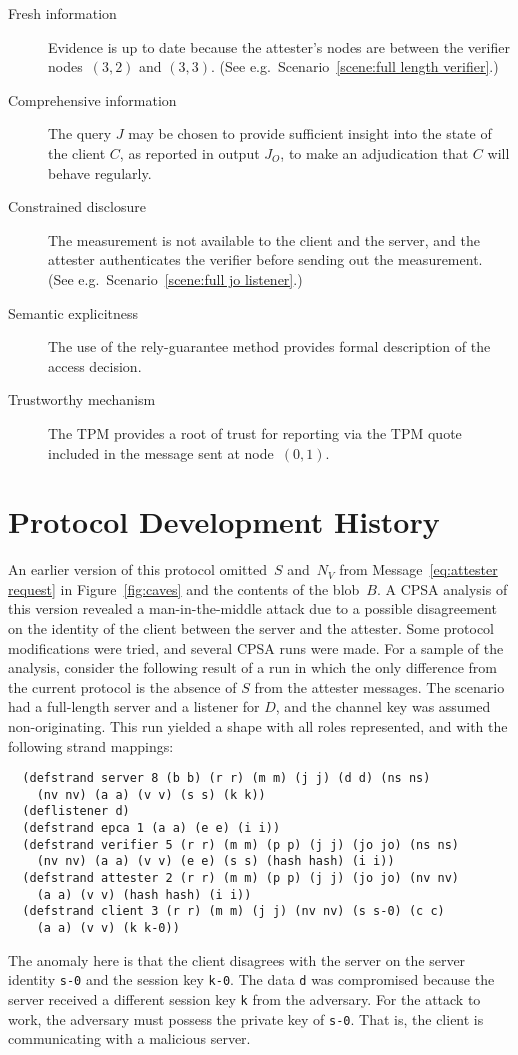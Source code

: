 \documentclass[titlepage,12pt]{article}
\theoremstyle{definition}
\begin{document}
\begin{description}
  \item[Fresh information] Evidence is up to date because the
  attester's nodes are between the verifier nodes~$(3,2)$ and
  $(3,3)$.  (See e.g.~Scenario~\ref{scene:full length verifier}.)
  \item[Comprehensive information] The query $J$ may be chosen to
  provide sufficient insight into the state of the client $C$, as
  reported in output $J_O$, to make an adjudication that $C$ will
  behave regularly.
  \item[Constrained disclosure] The measurement is not available to
  the client and the server, and the attester authenticates the
  verifier before sending out the measurement.  (See
  e.g.~Scenario~\ref{scene:full jo listener}.)
\item[Semantic explicitness] The use of the rely-guarantee method
  provides formal description of the access decision.
\item[Trustworthy mechanism] The TPM provides a root of trust for
  reporting via the TPM quote included in the message sent at
  node~$(0,1)$.
\end{description}

\section{Protocol Development History}

An earlier version of this protocol omitted~$S$ and~$N_V$ from
Message~\ref{eq:attester request} in Figure~\ref{fig:caves} and the
contents of the blob~$B$.  A CPSA analysis of this version revealed a
man-in-the-middle attack due to a possible disagreement on the
identity of the client between the server and the attester. Some
protocol modifications were tried, and several CPSA runs were
made. For a sample of the analysis, consider the following result of a
run in which the only difference from the current protocol is the
absence of $S$ from the attester messages. The scenario had a
full-length server and a listener for $D$, and the channel key was
assumed non-originating.  This run yielded a shape with all roles
represented, and with the following strand mappings:
\begin{verbatim}
  (defstrand server 8 (b b) (r r) (m m) (j j) (d d) (ns ns)
    (nv nv) (a a) (v v) (s s) (k k))
  (deflistener d)
  (defstrand epca 1 (a a) (e e) (i i))
  (defstrand verifier 5 (r r) (m m) (p p) (j j) (jo jo) (ns ns)
    (nv nv) (a a) (v v) (e e) (s s) (hash hash) (i i))
  (defstrand attester 2 (r r) (m m) (p p) (j j) (jo jo) (nv nv)
    (a a) (v v) (hash hash) (i i))
  (defstrand client 3 (r r) (m m) (j j) (nv nv) (s s-0) (c c)
    (a a) (v v) (k k-0))
\end{verbatim}
The anomaly here is that the client disagrees with the server on the
server identity \texttt{s-0} and the session key \texttt{k-0}.  The
data \texttt{d} was compromised because the server received a
different session key \texttt{k} from the adversary. For the attack to
work, the adversary must possess the private key of \texttt{s-0}. That
is, the client is communicating with a malicious server.
\end{document}
